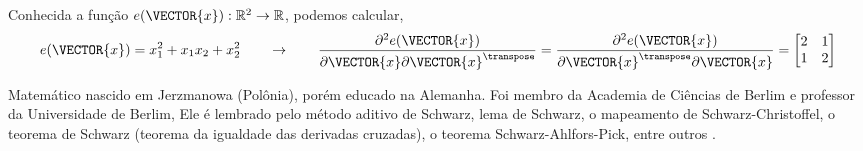 \begin{example}
Conhecida a função $e(\VECTOR{x}): \mathbb{R}^2 \rightarrow \mathbb{R}$, podemos calcular,
\begin{equation}
e(\VECTOR{x})=x_1^2+x_1 x_2+x_2^2
\qquad \rightarrow \qquad
\frac{\partial^2 e(\VECTOR{x}) }{\partial \VECTOR{x} \partial \VECTOR{x}^{\transpose}}=
\frac{\partial^2 e(\VECTOR{x}) }{\partial \VECTOR{x}^{\transpose} \partial \VECTOR{x}}=
\begin{bmatrix}
 2 & 1 \\
 1 & 2
\end{bmatrix}
\end{equation}
\end{example}

\begin{elaboracion}[title=Karl Hermann Amandus Schwarz (1843-1921), width= 0.99\linewidth]
Matemático nascido em Jerzmanowa (Polônia), porém  educado na Alemanha.
Foi membro da Academia de Ciências de Berlim e professor da Universidade de Berlim,
Ele é lembrado pelo método aditivo de Schwarz, lema de Schwarz, o mapeamento de Schwarz-Christoffel, 
o teorema de Schwarz (teorema da igualdade das derivadas cruzadas), o teorema Schwarz-Ahlfors-Pick, entre outros \cite[pp. 297]{agarwal2014creators}.
\end{elaboracion}

